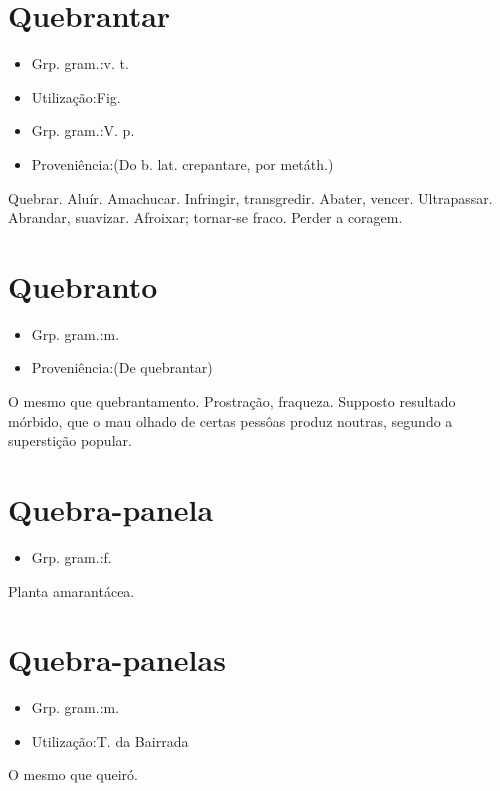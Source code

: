 \section{Quebrantar}
\begin{itemize}
\item {Grp. gram.:v. t.}
\end{itemize}
\begin{itemize}
\item {Utilização:Fig.}
\end{itemize}
\begin{itemize}
\item {Grp. gram.:V. p.}
\end{itemize}
\begin{itemize}
\item {Proveniência:(Do b. lat. \textunderscore crepantare\textunderscore , por metáth.)}
\end{itemize}
Quebrar.
Aluír.
Amachucar.
Infringir, transgredir.
Abater, vencer.
Ultrapassar.
Abrandar, suavizar.
Afroixar; tornar-se fraco.
Perder a coragem.
\section{Quebranto}
\begin{itemize}
\item {Grp. gram.:m.}
\end{itemize}
\begin{itemize}
\item {Proveniência:(De \textunderscore quebrantar\textunderscore )}
\end{itemize}
O mesmo que \textunderscore quebrantamento\textunderscore .
Prostração, fraqueza.
Supposto resultado mórbido, que o mau olhado de certas pessôas produz noutras, segundo a superstição popular.
\section{Quebra-panela}
\begin{itemize}
\item {Grp. gram.:f.}
\end{itemize}
Planta amarantácea.
\section{Quebra-panelas}
\begin{itemize}
\item {Grp. gram.:m.}
\end{itemize}
\begin{itemize}
\item {Utilização:T. da Bairrada}
\end{itemize}
O mesmo que \textunderscore queiró\textunderscore .
